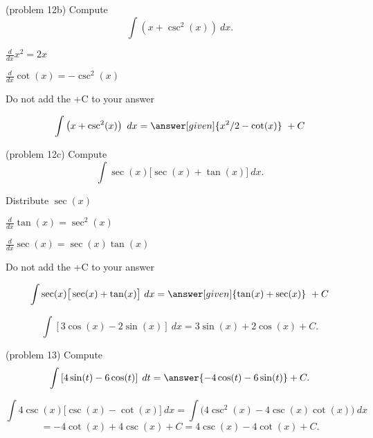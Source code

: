 \documentclass{ximera}
\begin{document}
\begin{problem}(problem 12b)
Compute
\[
\int \left(x + \csc^2(x) \right) \ dx.
\]

\begin{hint}
$\frac{d}{dx} x^2 = 2x$
\end{hint}
\begin{hint}
$\frac{d}{dx} \cot(x) = -\csc^2(x)$
\end{hint}
\begin{hint}
\begin{center}
Do not add the +C to your answer
\end{center}
\end{hint}

\[
\int \left(x + \csc^2(x) \right) \ dx =
\answer[given]{x^2 /2 - \cot(x)} \ +  C
\]
\end{problem}

\begin{problem}(problem 12c)
Compute
\[
\int \sec(x)\big[\sec(x) + \tan(x) \big] \ dx.
\]

\begin{hint}
Distribute $\sec(x)$
\end{hint}
\begin{hint}
$\frac{d}{dx} \tan(x) = \sec^2(x)$
\end{hint}
\begin{hint}
$\frac{d}{dx} \sec(x) = \sec(x)\tan(x)$
\end{hint}
\begin{hint}
\begin{center}
Do not add the +C to your answer
\end{center}
\end{hint}

\[
\int \sec(x)\big[\sec(x) + \tan(x) \big] \ dx =
\answer[given]{\tan(x) + \sec(x)} \ +  C
\]
\end{problem}



\begin{example}[example 13]
\[
\int \left[3\cos(x) - 2\sin(x)\right] \ dx = 3\sin(x) + 2\cos(x) + C.
\]
\end{example}


\begin{problem}(problem 13)
Compute
\[
\int \left[4\sin(t) - 6\cos(t)\right] \; dt = \answer{-4\cos(t) - 6\sin(t)} + C.
\]
\end{problem}

\begin{example}[example 14]
\[
\int 4\csc(x)\big[\csc(x) - \cot(x)\big] \ dx = \int \big(4\csc^2(x)  - 4\csc(x)\cot(x)\big) \ dx
\]
\[
 = -4\cot(x) + 4\csc(x) + C
= 4\csc(x) - 4 \cot(x) + C.
\]
\end{example}
\end{document}
